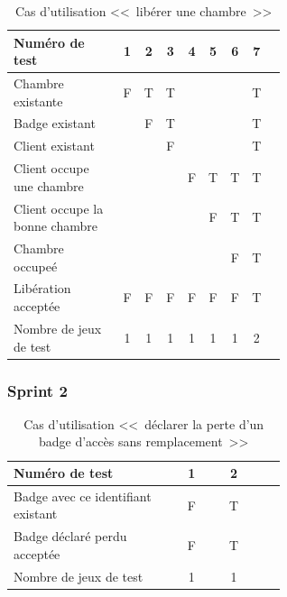 \documentclass[11pt,article]{article}
\begin{document}
        \begin{table}[htbp!]
            \begin{tabular}{|p{0.6\linewidth}|c|c|c|c|c|c|c|c|}
                \hline
                Numéro de test
                    &1&2&3&4&5&6&7\\
                \hline
                \hline

                Chambre existante
                    &F&T&T& & & &T\\
                \hline
                Badge existant
                    & &F&T& & & &T\\
                \hline
                Client existant
                    & & &F& & & &T\\
                \hline
				\hline
                Client occupe une chambre
                    & & & &F&T&T&T\\
                \hline
                Client occupe la bonne chambre
                    & & & & &F&T&T\\
				\hline
				\hline
				Chambre occupeé
					& & & & & &F&T\\
                \hline
                \hline                Libération acceptée
                    &F&F&F&F&F&F&T\\
                \hline
                \hline
                Nombre de jeux de test
                    &1&1&1&1&1&1&2 \\
                \hline
            \end{tabular}
            \caption{Cas d'utilisation <<~libérer une chambre~>>}
        \end{table}

		\newpage

		        \subsubsection{Sprint 2}

		            \begin{table}[htbp!]
		                \begin{tabular}{|p{0.6\linewidth}|c|c|c|}
		                    \hline
		                    Numéro de test
		                        &1&2\\
		                    \hline
		                    \hline
		                   Badge avec ce identifiant existant
		                        &F&T\\
		                    \hline
		                    \hline
		                    Badge déclaré perdu acceptée
		                        &F&T\\
		                    \hline
		                    \hline
		                    Nombre de jeux de test
		                        &1&1\\
		                    \hline
		                \end{tabular}
		                \caption{Cas d'utilisation <<~déclarer la perte d'un badge d'accès sans remplacement~>>}
		            \end{table}
\newpage
\end{document}
